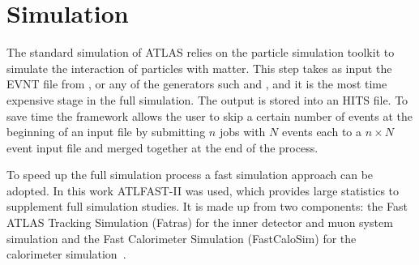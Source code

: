 \section{Simulation}
The standard simulation of ATLAS relies on the \geant particle simulation toolkit to simulate the interaction of particles with matter. This step takes as input the EVNT file from \PYTHIA, or any of the generators such \HERWIG and \SHERPA, and it is the most time expensive stage in the full simulation. The output is stored into an HITS file. To save time the framework allows the user to skip a certain number of events at the beginning of an input file by submitting $n$ jobs with $N$ events each to a $n\times N$ event input file and merged together at the end of the process.



To speed up the full simulation process a fast simulation approach can be adopted. In this work ATLFAST-II was used, which provides large statistics to supplement full simulation studies. It is made up from two components: the Fast ATLAS Tracking Simulation (Fatras) for the inner detector and muon system simulation and the Fast Calorimeter Simulation (FastCaloSim) for the calorimeter simulation~\cite{simulation}. 

